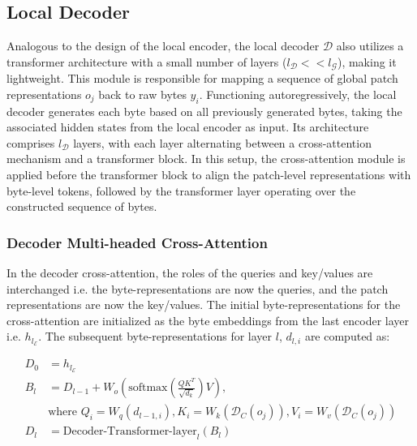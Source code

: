 \subsection{Local Decoder} 

Analogous to the design of the local encoder, the local decoder $\mathcal{D}$ also utilizes a transformer architecture with a small number of layers ($l_{\mathcal{D}} << l_{\mathcal{G}}$), making it lightweight. This module is responsible for mapping a sequence of global patch representations $o_j$ back to raw bytes $y_i$. Functioning autoregressively, the local decoder generates each byte based on all previously generated bytes, taking the associated hidden states from the local encoder as input. Its architecture comprises $l_{\mathcal{D}}$ layers, with each layer alternating between a cross-attention mechanism and a transformer block. In this setup, the cross-attention module is applied before the transformer block to align the patch-level representations with byte-level tokens, followed by the transformer layer operating over the constructed sequence of bytes.

\subsubsection{Decoder Multi-headed Cross-Attention} 

In the decoder cross-attention, the roles of the queries and key/values are interchanged i.e. the byte-representations are now the queries, and the patch representations are now the key/values. The initial byte-representations for the cross-attention are initialized as the byte embeddings from the last encoder layer i.e. $h_{l_{\mathcal{E}}}$. The subsequent byte-representations for layer $l$, $d_{l,i}$ are computed as:

\begin{align}
D_0 &= h_{l_{\mathcal{E}}} \\
B_l &= D_{l-1} + W_o\left(\text{softmax}\left(\frac{QK^T}{\sqrt{d_k}}\right)V\right), \\
  &\text{where } Q_i = W_q(d_{l-1,i}), K_i = W_k(\mathcal{D}_C(o_j)), V_i = W_v(\mathcal{D}_C(o_j)) \\
  D_l &= \text{Decoder-Transformer-layer}_l(B_l)
\end{align}


